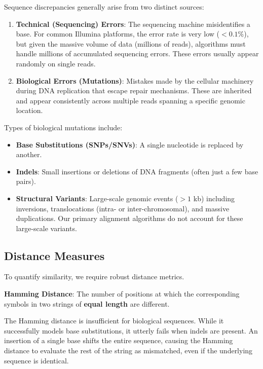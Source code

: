 \documentclass[11pt,a4paper]{article}
\newcommand{\sta}{\textbf{\textcolor{red}{\sffamily\upshape [!]}} }
\begin{document}
Sequence discrepancies generally arise from two distinct sources:
\begin{enumerate}
    \item \textbf{Technical (Sequencing) Errors}: The sequencing machine misidentifies a base. For common Illumina platforms, the error rate is very low (\(< 0.1\%\)), but given the massive volume of data (millions of reads), algorithms must handle millions of accumulated sequencing errors. These errors usually appear randomly on single reads.
    \item \textbf{Biological Errors (Mutations)}: Mistakes made by the cellular machinery during DNA replication that escape repair mechanisms. These are inherited and appear consistently across multiple reads spanning a specific genomic location.
\end{enumerate}

Types of biological mutations include:
\begin{itemize}
    \item \textbf{Base Substitutions (SNPs/SNVs)}: A single nucleotide is replaced by another.
    \item \textbf{Indels}: Small insertions or deletions of DNA fragments (often just a few base pairs). 
    \item \textbf{Structural Variants}: Large-scale genomic events (\(>1\) kb) including inversions, translocations (intra- or inter-chromosomal), and massive duplications. Our primary alignment algorithms do not account for these large-scale variants.
\end{itemize}

\subsection{Distance Measures}

To quantify similarity, we require robust distance metrics.

\begin{important}
\textbf{Hamming Distance}: The number of positions at which the corresponding symbols in two strings of \textbf{equal length} are different.
\end{important}

\sta The Hamming distance is insufficient for biological sequences. While it successfully models base substitutions, it utterly fails when indels are present. An insertion of a single base shifts the entire sequence, causing the Hamming distance to evaluate the rest of the string as mismatched, even if the underlying sequence is identical.
\end{document}
